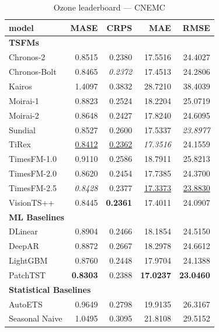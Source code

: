 \begin{table}[H]
\caption{Ozone leaderboard --- CNEMC}
\centering
\begin{small}
\begin{tabular}{lrrrr}
\toprule
model & MASE & CRPS & MAE & RMSE \\
\midrule
\multicolumn{5}{l}{\textbf{TSFMs}} \\
Chronos-2 & 0.8515 & 0.2380 & 17.5516 & 24.4027 \\
Chronos-Bolt & 0.8465 & \textit{0.2372} & 17.4513 & 24.2806 \\
Kairos & 1.4097 & 0.3832 & 28.7210 & 38.4039 \\
Moirai-1 & 0.8823 & 0.2524 & 18.2204 & 25.0719 \\
Moirai-2 & 0.8648 & 0.2427 & 17.8240 & 24.6095 \\
Sundial & 0.8527 & 0.2600 & 17.5337 & \textit{23.8977} \\
TiRex & \underline{0.8412} & \underline{0.2362} & \textit{17.3516} & 24.1559 \\
TimesFM-1.0 & 0.9110 & 0.2586 & 18.7911 & 25.8213 \\
TimesFM-2.0 & 0.8620 & 0.2454 & 17.7385 & 24.3700 \\
TimesFM-2.5 & \textit{0.8428} & 0.2377 & \underline{17.3373} & \underline{23.8830} \\
VisionTS++ & 0.8445 & \textbf{0.2361} & 17.4011 & 24.0907 \\
\midrule
\multicolumn{5}{l}{\textbf{ML Baselines}} \\
DLinear & 0.8904 & 0.2466 & 18.1854 & 24.5150 \\
DeepAR & 0.8872 & 0.2667 & 18.2978 & 24.6612 \\
LightGBM & 0.8760 & 0.2448 & 17.9704 & 24.1388 \\
PatchTST & \textbf{0.8303} & 0.2388 & \textbf{17.0237} & \textbf{23.0460} \\
\midrule
\multicolumn{5}{l}{\textbf{Statistical Baselines}} \\
AutoETS & 0.9649 & 0.2798 & 19.9135 & 26.3167 \\
Seasonal Naive & 1.0495 & 0.3095 & 21.8108 & 29.5152 \\
\bottomrule
\end{tabular}
\end{small}
\end{table}